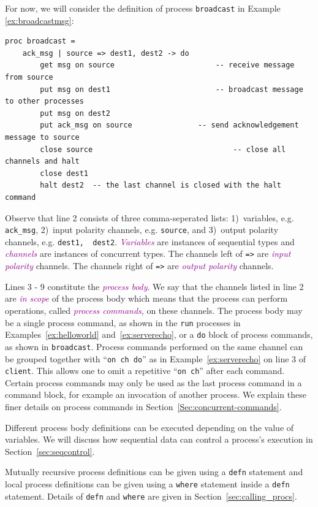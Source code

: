 \documentclass[acmsmall]{acmart}
\newcommand{\tc}[1]{\textcolor{darkMagenta}{\textit{#1}}}
\begin{document}
For now, we will consider the definition of process \lstinline$broadcast$ in Example \ref{ex:broadcastmsg}:
\begin{lstlisting}[label=ex:broadcastmsg, caption=Process that broadcasts a message from a single source] 
proc broadcast = 
	ack_msg | source => dest1, dest2 -> do
		get msg on source						-- receive message from source
		put msg on dest1						-- broadcast message to other processes
		put msg on dest2
		put ack_msg on source				-- send acknowledgement message to source
		close source								-- close all channels and halt
		close dest1
		halt dest2  -- the last channel is closed with the halt command
\end{lstlisting}
Observe that line 2 consists of three comma-seperated lists: 1)~variables, e.g. \lstinline$ack_msg$, 2)~input polarity channels, e.g. \lstinline$source$, and 3)~output polarity channels, e.g. \lstinline$dest1,  dest2$.
\tc{Variables} are instances of sequential types and \tc{channels} are instances of concurrent types.
The channels left of \lstinline$=>$ are \tc{input polarity} channels.
The channels right of \lstinline$=>$ are \tc{output polarity} channels.

Lines 3 - 9 constitute the \tc{process body}.
We say that the channels listed in line 2 are \tc{in scope} of the process body which means that the process can perform operations, called \tc{process commands}, on these channels.
The process body may be a single process command, as shown in the \lstinline$run$ processes in Examples~\ref{ex:helloworld} and~\ref{ex:serverecho}, or a \lstinline$do$ block of process commands, as shown in \lstinline$broadcast$.
Process commands performed on the same channel can be grouped together with ``\lstinline$on ch do$'' as in Example~\ref{ex:serverecho} on line 3 of \lstinline$client$.
This allows one to omit a repetitive ``\lstinline$on ch$'' after each command.
Certain process commands may only be used as the last process command in a command block, for example an invocation of another process. 
We explain these finer details on process commands in Section~\ref{Sec:concurrent-commands}.

Different process body definitions can be executed depending on the value of variables.
We will discuss how sequential data can control a process's execution in Section~\ref{sec:seqcontrol}.

Mutually recursive process definitions can be given using a \lstinline$defn$ statement and local process definitions can be given using a \lstinline$where$ statement inside a \lstinline$defn$ statement. 
Details of \lstinline$defn$ and \lstinline$where$ are given in Section~\ref{sec:calling_procs}.
\end{document}

